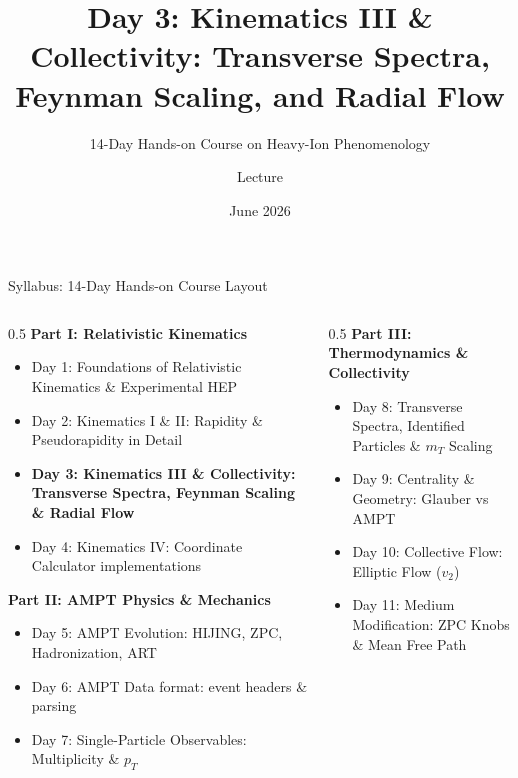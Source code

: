 \documentclass[aspectratio=169]{beamer}
\title[AMPT Course --- Day 3]{Day 3: Kinematics III \& Collectivity: Transverse Spectra, Feynman Scaling, and Radial Flow}
\subtitle{14-Day Hands-on Course on Heavy-Ion Phenomenology}
\author[MSc-Lecture Series]{Lecture}
\institute[NIT-J, HEP-119]{NIT-J, HEP-119}
\date{June 2026}
\begin{document}
\begin{frame}
    \titlepage
\end{frame}

\begin{frame}{Syllabus: 14-Day Hands-on Course Layout}
    \begin{columns}
        \begin{column}{0.5\textwidth}
            \footnotesize
            \textbf{Part I: Relativistic Kinematics}
            \begin{itemize}
                \item Day 1: Foundations of Relativistic Kinematics \& Experimental HEP
                \item Day 2: Kinematics I \& II: Rapidity \& Pseudorapidity in Detail
                \item \textbf{Day 3: Kinematics III \& Collectivity: Transverse Spectra, Feynman Scaling \& Radial Flow}
                \item Day 4: Kinematics IV: Coordinate Calculator implementations
            \end{itemize}
            \vspace{0.05cm}
            \textbf{Part II: AMPT Physics \& Mechanics}
            \begin{itemize}
                \item Day 5: AMPT Evolution: HIJING, ZPC, Hadronization, ART
                \item Day 6: AMPT Data format: event headers \& parsing
                \item Day 7: Single-Particle Observables: Multiplicity \& $p_T$
            \end{itemize}
        \end{column}
        \begin{column}{0.5\textwidth}
            \footnotesize
            \textbf{Part III: Thermodynamics \& Collectivity}
            \begin{itemize}
                \item Day 8: Transverse Spectra, Identified Particles \& $m_T$ Scaling
                \item Day 9: Centrality \& Geometry: Glauber vs AMPT
                \item Day 10: Collective Flow: Elliptic Flow ($v_2$)
                \item Day 11: Medium Modification: ZPC Knobs \& Mean Free Path
            \end{itemize}

\end{column}
\end{columns}
\end{frame}
\end{document}
